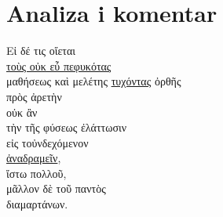 \section*{Analiza i komentar}


{\large
\begin{greek}
\noindent Εἰ δέ τις οἴεται \\
\tabto{2em} \underline{τοὺς οὐκ εὖ πεφυκότας} \\
\tabto{4em} μαθήσεως καὶ μελέτης \underline{τυχόντας} ὀρθῆς \\
\tabto{6em} πρὸς ἀρετὴν \\
\tabto{4em} οὐκ ἂν \\
\tabto{6em} τὴν τῆς φύσεως ἐλάττωσιν \\
\tabto{8em} εἰς τοὐνδεχόμενον \\
\tabto{6em} \underline{ἀναδραμεῖν}, \\
ἴστω πολλοῦ, \\
\tabto{2em} μᾶλλον δὲ τοῦ παντὸς \\
διαμαρτάνων.\\

\end{greek}
}

